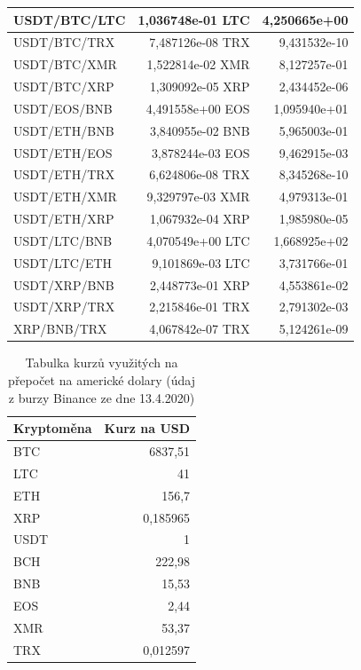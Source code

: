 \documentclass[thesis=B,czech]{FITthesis}[2019/03/21]
\begin{document}
\begin{table}
\begin{tabular}{|| l | r | r ||}
 \hline USDT/BTC/LTC & 1,036748e-01 LTC & 4,250665e+00\\ 
 \hline USDT/BTC/TRX & 7,487126e-08 TRX & 9,431532e-10\\ 
 \hline USDT/BTC/XMR & 1,522814e-02 XMR & 8,127257e-01\\ 
 \hline USDT/BTC/XRP & 1,309092e-05 XRP & 2,434452e-06\\ 
 \hline USDT/EOS/BNB & 4,491558e+00 EOS & 1,095940e+01\\ 
 \hline USDT/ETH/BNB & 3,840955e-02 BNB & 5,965003e-01\\ 
 \hline USDT/ETH/EOS & 3,878244e-03 EOS & 9,462915e-03\\ 
 \hline USDT/ETH/TRX & 6,624806e-08 TRX & 8,345268e-10\\ 
 \hline USDT/ETH/XMR & 9,329797e-03 XMR & 4,979313e-01\\ 
 \hline USDT/ETH/XRP & 1,067932e-04 XRP & 1,985980e-05\\ 
 \hline USDT/LTC/BNB & 4,070549e+00 LTC & 1,668925e+02\\ 
 \hline USDT/LTC/ETH & 9,101869e-03 LTC & 3,731766e-01\\ 
 \hline USDT/XRP/BNB & 2,448773e-01 XRP & 4,553861e-02\\ 
 \hline USDT/XRP/TRX & 2,215846e-01 TRX & 2,791302e-03\\ 
 \hline XRP/BNB/TRX & 4,067842e-07 TRX & 5,124261e-09\\ 
 \hline
\end{tabular}
\end{table}

\begin{table}\centering
\caption{Tabulka kurzů využitých na přepočet na americké dolary (údaj z burzy Binance ze dne 13.4.2020)}
\label{table_rates}
\begin{tabular}{|| l | r ||}
\hline Kryptoměna & Kurz na USD \\ 
\hline\hline BTC & 6837,51 \\ 
\hline LTC & 41 \\ 
\hline ETH & 156,7 \\ 
\hline XRP & 0,185965 \\ 
\hline USDT & 1 \\ 
\hline BCH & 222,98 \\ 
\hline BNB & 15,53 \\ 
\hline EOS & 2,44 \\ 
\hline XMR & 53,37 \\ 
\hline TRX & 0,012597 \\ 
\hline
\end{tabular}
\end{table}
\end{document}
